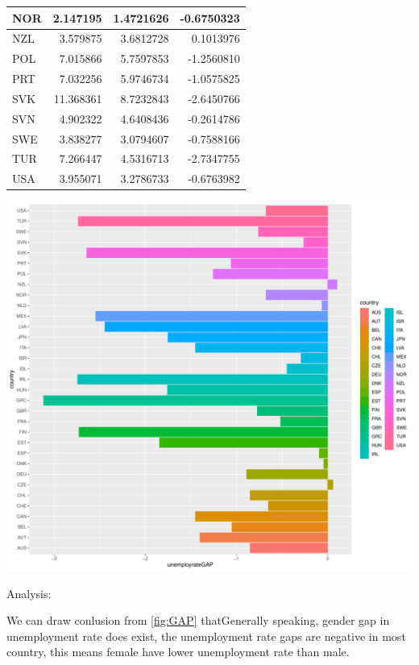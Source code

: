 \documentclass[11pt,a4paper,]{article}
\let\origfigure\figure
\let\endorigfigure\endfigure
\renewenvironment{figure}[1][2] {
    \expandafter\origfigure\expandafter[H]
} {
    \endorigfigure
}%
\begin{document}
\begin{table}
\begin{tabular}[t]{l|r|r|r}
\hline
NOR & 2.147195 & 1.4721626 & -0.6750323\\
\hline
NZL & 3.579875 & 3.6812728 & 0.1013976\\
\hline
POL & 7.015866 & 5.7597853 & -1.2560810\\
\hline
PRT & 7.032256 & 5.9746734 & -1.0575825\\
\hline
SVK & 11.368361 & 8.7232843 & -2.6450766\\
\hline
SVN & 4.902322 & 4.6408436 & -0.2614786\\
\hline
SWE & 3.838277 & 3.0794607 & -0.7588166\\
\hline
TUR & 7.266447 & 4.5316713 & -2.7347755\\
\hline
USA & 3.955071 & 3.2786733 & -0.6763982\\
\hline
\end{tabular}
\end{table}

\newpage

\begin{figure}
\centering
\includegraphics{ETC5513assignment4_files/figure-latex/GAP-1.pdf}
\caption{\label{fig:GAP}unemployment gender gap}
\end{figure}

Analysis:

We can draw conlusion from \ref{fig:GAP} thatGenerally speaking, gender gap in unemployment rate does exist, the unemployment rate gaps are negative in most country, this means female have lower unemployment rate than male.
\end{document}
